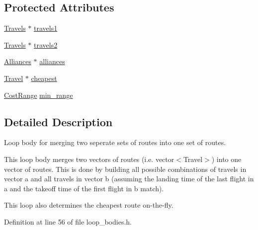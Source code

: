 \subsection*{Protected Attributes}
\begin{DoxyCompactItemize}
\item 
\hyperlink{types_8h_aef021ba284c03a12dddcfa082468e831}{Travels} $\ast$ \hyperlink{classoma_1_1_path_merging_outer_loop_a61af3682cfb1d946562ac58dc8aef6da}{travels1}
\item 
\hyperlink{types_8h_aef021ba284c03a12dddcfa082468e831}{Travels} $\ast$ \hyperlink{classoma_1_1_path_merging_outer_loop_a8d9fc3c7385d6686cec596d6127b9496}{travels2}
\item 
\hyperlink{types_8h_a942cbcc40778424afe78605ae5c364c0}{Alliances} $\ast$ \hyperlink{classoma_1_1_path_merging_outer_loop_a52eab1b9a4ae98f9afb66a9e4b3f479c}{alliances}
\item 
\hyperlink{class_travel}{Travel} $\ast$ \hyperlink{classoma_1_1_path_merging_outer_loop_a4840a5cd40a7c1bbbdc48c6b3be80349}{cheapest}
\item 
\hyperlink{class_cost_range}{Cost\-Range} \hyperlink{classoma_1_1_path_merging_outer_loop_a064fc673b5ddeaffe9a78b5c0e1558aa}{min\-\_\-range}
\end{DoxyCompactItemize}


\subsection{Detailed Description}
Loop body for merging two seperate sets of routes into one set of routes. 

This loop body merges two vectors of routes (i.\-e. vector$<$\-Travel$>$) into one vector of routes. This is done by building all possible combinations of travels in vector a and all travels in vector b (assuming the landing time of the last flight in a and the takeoff time of the first flight in b match).

This loop also determines the cheapest route on-\/the-\/fly. 

Definition at line 56 of file loop\-\_\-bodies.\-h.



